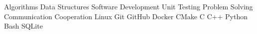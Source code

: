 
\begin{cventries}
    \cventryii
        {Algorithms \cvseparator Data Structures \cvseparator Software Development \cvseparator Unit Testing}
        {}
    \cventryii
        {Problem Solving \cvseparator Communication \cvseparator Cooperation}
        {}
    \cventryii
        {Linux \cvseparator Git \cvseparator GitHub \cvseparator Docker \cvseparator CMake}
        {}
    \cventryii
        {C \cvseparator C++ \cvseparator Python \cvseparator Bash}
        {}
    \cventryii
        {SQLite}
        {}
\end{cventries}

